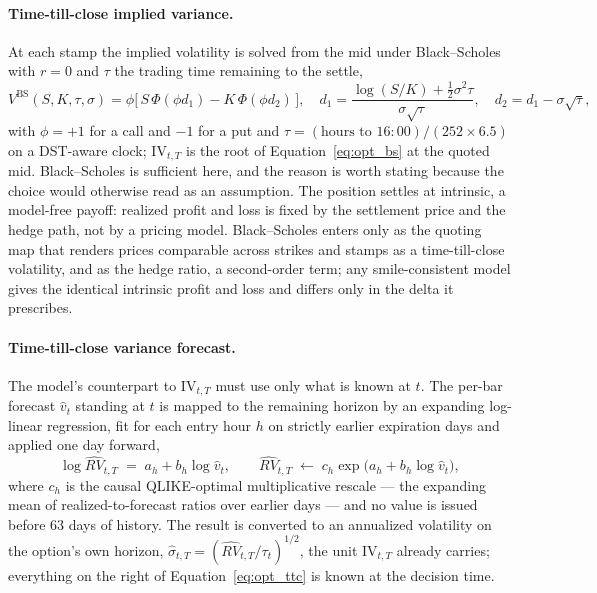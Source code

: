 \paragraph{Time-till-close implied variance.} At each stamp the implied
volatility is solved from the mid under Black--Scholes with $r = 0$ and
$\tau$ the trading time remaining to the settle,
\begin{equation}
    V^{\mathrm{BS}}(S, K, \tau, \sigma)
    = \phi \bigl[\, S\,\Phi(\phi d_1) - K\,\Phi(\phi d_2) \,\bigr],
    \quad
    d_1 = \frac{\log (S/K) + \tfrac{1}{2}\sigma^2 \tau}{\sigma\sqrt{\tau}},
    \quad
    d_2 = d_1 - \sigma\sqrt{\tau},
    \label{eq:opt_bs}
\end{equation}
with $\phi = +1$ for a call and $-1$ for a put and
$\tau = (\text{hours to } 16{:}00)/(252 \times 6.5)$ on a DST-aware
clock; $\mathrm{IV}_{t,T}$ is the root of Equation~\eqref{eq:opt_bs} at
the quoted mid. Black--Scholes is sufficient here, and the reason is worth
stating because the choice would otherwise read as an assumption. The
position settles at intrinsic, a model-free payoff: realized profit and
loss is fixed by the settlement price and the hedge path, not by a
pricing model. Black--Scholes enters only as the quoting map that renders
prices comparable across strikes and stamps as a time-till-close
volatility, and as the hedge ratio, a second-order term; any
smile-consistent model gives the identical intrinsic profit and loss and
differs only in the delta it prescribes.

\paragraph{Time-till-close variance forecast.} The model's counterpart to
$\mathrm{IV}_{t,T}$ must use only what is known at $t$. The per-bar
forecast $\hat v_t$ standing at $t$ is mapped to the remaining horizon by
an expanding log-linear regression, fit for each entry hour $h$ on
strictly earlier expiration days and applied one day forward,
\begin{equation}
    \log \widehat{RV}_{t,T} \;=\; a_h + b_h \log \hat v_t,
    \qquad
    \widehat{RV}_{t,T} \;\leftarrow\;
      c_h \exp\bigl(a_h + b_h \log \hat v_t\bigr),
    \label{eq:opt_ttc}
\end{equation}
where $c_h$ is the causal QLIKE-optimal multiplicative rescale --- the
expanding mean of realized-to-forecast ratios over earlier days --- and
no value is issued before $63$ days of history. The result is converted
to an annualized volatility on the option's own horizon,
$\hat\sigma_{t,T} = ( \widehat{RV}_{t,T} / \tau_t )^{1/2}$, the unit
$\mathrm{IV}_{t,T}$ already carries; everything on the right of
Equation~\eqref{eq:opt_ttc} is known at the decision time.

